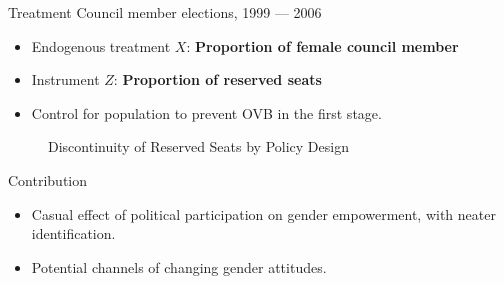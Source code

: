 \documentclass[
  10pt,
  ignorenonframetext,
  aspectratio=43,
]{beamer}
\providecommand{\tightlist}{%
  \setlength{\itemsep}{0pt}\setlength{\parskip}{0pt}}
\begin{document}
\begin{frame}
\begin{block}{Treatment}
\protect\hypertarget{treatment}{}
Council member elections, 1999 --- 2006

\begin{itemize}
\tightlist
\item
  Endogenous treatment \(X\): \textbf{Proportion of female council
  member}
\item
  Instrument \(Z\): \textbf{Proportion of reserved seats}
\item
  Control for population to prevent OVB in the first stage.
\end{itemize}

\begin{figure}[htb]
\centering
{}
\caption{Discontinuity of Reserved Seats by Policy Design}
\end{figure}
\end{block}
\end{frame}

\begin{frame}{Contribution}
\protect\hypertarget{contribution}{}
\begin{itemize}
\tightlist
\item
  Casual effect of political participation on gender empowerment, with
  neater identification.
\item
  Potential channels of changing gender attitudes.
\end{itemize}
\end{frame}
\end{document}
